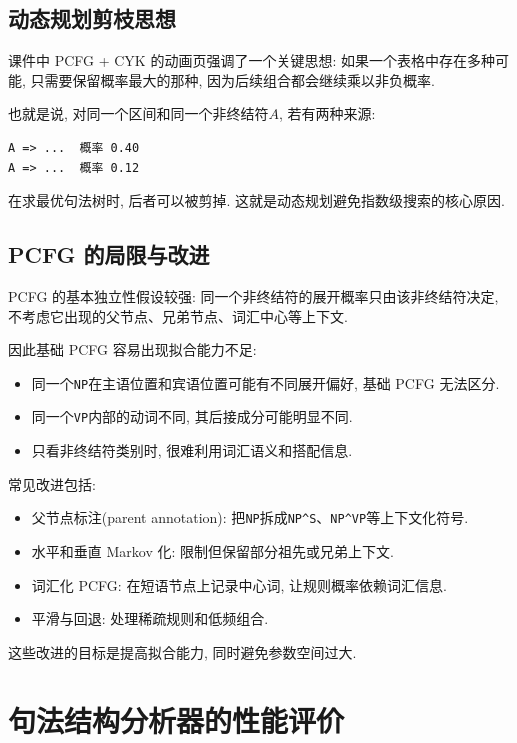 \subsection{动态规划剪枝思想}


课件中 PCFG + CYK 的动画页强调了一个关键思想:
如果一个表格中存在多种可能, 只需要保留概率最大的那种, 因为后续组合都会继续乘以非负概率.

也就是说, 对同一个区间和同一个非终结符$A$, 若有两种来源:

\begin{Verbatim}[breaklines=true,breakanywhere=true,fontsize=\small]
A => ...  概率 0.40
A => ...  概率 0.12
\end{Verbatim}

在求最优句法树时, 后者可以被剪掉.
这就是动态规划避免指数级搜索的核心原因.

\subsection{PCFG 的局限与改进}


PCFG 的基本独立性假设较强:
同一个非终结符的展开概率只由该非终结符决定, 不考虑它出现的父节点、兄弟节点、词汇中心等上下文.

因此基础 PCFG 容易出现拟合能力不足:

\begin{itemize}
\item 同一个\texttt{NP}在主语位置和宾语位置可能有不同展开偏好, 基础 PCFG 无法区分.
\item 同一个\texttt{VP}内部的动词不同, 其后接成分可能明显不同.
\item 只看非终结符类别时, 很难利用词汇语义和搭配信息.
\end{itemize}

常见改进包括:

\begin{itemize}
\item 父节点标注(parent annotation): 把\texttt{NP}拆成\texttt{NP\textasciicircum{}S}、\texttt{NP\textasciicircum{}VP}等上下文化符号.
\item 水平和垂直 Markov 化: 限制但保留部分祖先或兄弟上下文.
\item 词汇化 PCFG: 在短语节点上记录中心词, 让规则概率依赖词汇信息.
\item 平滑与回退: 处理稀疏规则和低频组合.
\end{itemize}

这些改进的目标是提高拟合能力, 同时避免参数空间过大.

\section{句法结构分析器的性能评价}


